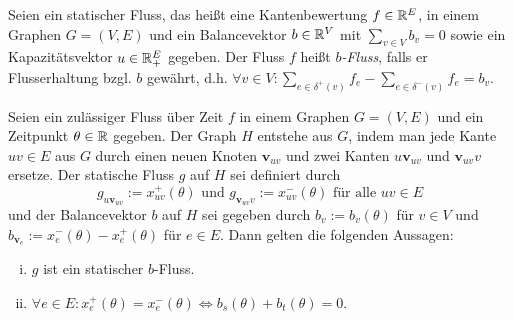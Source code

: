 
\begin{definition}
	Seien ein statischer Fluss, das heißt eine Kantenbewertung $f \in \mathbb{R}^E$, in einem Graphen $G=(V,E)$ und ein Balancevektor $b\in\mathbb{R}^V$ mit $\sum_{v\in V} b_v = 0$ sowie ein Kapazitätsvektor $u\in\mathbb{R}_+^E$ gegeben.
	Der Fluss $f$ heißt \emph{$b$-Fluss}, falls er Flusserhaltung bzgl. $b$ gewährt, d.h. $\forall v\in V: \sum_{e\in\delta^+(v)}f_e - \sum_{e\in\delta^-(v)}f_e = b_v$.
\end{definition}


\newcommand{\newv}{\mathbf{v}}
\begin{lemma}
	Seien ein zulässiger Fluss über Zeit $f$ in einem Graphen $G=(V,E)$ und ein Zeitpunkt $\theta\in\mathbb{R}$ gegeben.
	Der Graph $H$ entstehe aus $G$, indem man jede Kante $uv\in E$ aus $G$ durch einen neuen Knoten $\newv_{uv}$ und zwei Kanten $u\newv_{uv}$ und $\newv_{uv}v$ ersetze.
	Der statische Fluss $g$ auf $H$ sei definiert durch
	$$g_{u\newv_{uv}} := x_{uv}^+(\theta) \text{ und } g_{\newv_{uv}v} := x_{uv}^-(\theta) \text{ für alle $uv\in E$}$$
	und der Balancevektor $b$ auf $H$ sei gegeben durch $b_v:= b_v(\theta)$ für $v\in V$ und $b_{\newv_e}:= x_e^-(\theta) - x_e^+(\theta)$ für $e\in E$.
	Dann gelten die folgenden Aussagen:
	
	\begin{enumerate}[(i)]
		\item  $g$ ist ein statischer $b$-Fluss.
		\item $\forall e\in E : x_e^+(\theta) = x_e^-(\theta)\iff b_s(\theta) + b_t(\theta) = 0$.
	\end{enumerate}
\end{lemma} 
